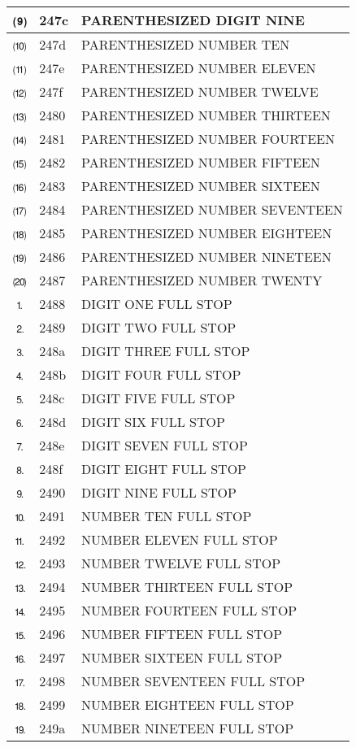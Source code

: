 \documentclass[12pt,letterpaper,openany]{book}
\begin{document}
\begin{center}
\begin{supertabular}{|m{0.25in}|m{0.5in}|m{4in}|}
⑼ & 247c & PARENTHESIZED DIGIT NINE\\\hline
⑽ & 247d & PARENTHESIZED NUMBER TEN\\\hline
⑾ & 247e & PARENTHESIZED NUMBER ELEVEN\\\hline
⑿ & 247f & PARENTHESIZED NUMBER TWELVE\\\hline
⒀ & 2480 & PARENTHESIZED NUMBER THIRTEEN\\\hline
⒁ & 2481 & PARENTHESIZED NUMBER FOURTEEN\\\hline
⒂ & 2482 & PARENTHESIZED NUMBER FIFTEEN\\\hline
⒃ & 2483 & PARENTHESIZED NUMBER SIXTEEN\\\hline
⒄ & 2484 & PARENTHESIZED NUMBER SEVENTEEN\\\hline
⒅ & 2485 & PARENTHESIZED NUMBER EIGHTEEN\\\hline
⒆ & 2486 & PARENTHESIZED NUMBER NINETEEN\\\hline
⒇ & 2487 & PARENTHESIZED NUMBER TWENTY\\\hline
⒈ & 2488 & DIGIT ONE FULL STOP\\\hline
⒉ & 2489 & DIGIT TWO FULL STOP\\\hline
⒊ & 248a & DIGIT THREE FULL STOP\\\hline
⒋ & 248b & DIGIT FOUR FULL STOP\\\hline
⒌ & 248c & DIGIT FIVE FULL STOP\\\hline
⒍ & 248d & DIGIT SIX FULL STOP\\\hline
⒎ & 248e & DIGIT SEVEN FULL STOP\\\hline
⒏ & 248f & DIGIT EIGHT FULL STOP\\\hline
⒐ & 2490 & DIGIT NINE FULL STOP\\\hline
⒑ & 2491 & NUMBER TEN FULL STOP\\\hline
⒒ & 2492 & NUMBER ELEVEN FULL STOP\\\hline
⒓ & 2493 & NUMBER TWELVE FULL STOP\\\hline
⒔ & 2494 & NUMBER THIRTEEN FULL STOP\\\hline
⒕ & 2495 & NUMBER FOURTEEN FULL STOP\\\hline
⒖ & 2496 & NUMBER FIFTEEN FULL STOP\\\hline
⒗ & 2497 & NUMBER SIXTEEN FULL STOP\\\hline
⒘ & 2498 & NUMBER SEVENTEEN FULL STOP\\\hline
⒙ & 2499 & NUMBER EIGHTEEN FULL STOP\\\hline
⒚ & 249a & NUMBER NINETEEN FULL STOP\\\hline

\end{supertabular}
\end{center}
\end{document}
